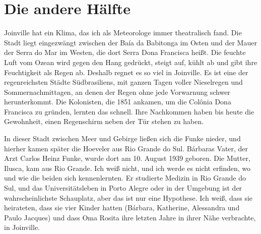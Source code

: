 \documentclass[
  ngerman,
  11pt,
  openany]{book}
\begin{document}
\section{Die andere Hälfte}\label{die-andere-huxe4lfte}

Joinville hat ein Klima, das ich als Meteorologe immer theatralisch
fand. Die Stadt liegt eingezwängt zwischen der Baía da Babitonga im
Osten und der Mauer der Serra do Mar im Westen, die dort Serra Dona
Francisca heißt. Die feuchte Luft vom Ozean wird gegen den Hang
gedrückt, steigt auf, kühlt ab und gibt ihre Feuchtigkeit als Regen ab.
Deshalb regnet es so viel in Joinville. Es ist eine der regenreichsten
Städte Südbrasiliens, mit ganzen Tagen voller Nieselregen und
Sommernachmittagen, an denen der Regen ohne jede Vorwarnung schwer
herunterkommt. Die Kolonisten, die 1851 ankamen, um die Colônia Dona
Francisca zu gründen, lernten das schnell. Ihre Nachkommen haben bis
heute die Gewohnheit, einen Regenschirm neben der Tür stehen zu haben.

In dieser Stadt zwischen Meer und Gebirge ließen sich die Funke nieder,
und hierher kamen später die Hoeveler aus Rio Grande do Sul. Bárbaras
Vater, der Arzt Carlos Heinz Funke, wurde dort am 10. August 1939
geboren. Die Mutter, Ilusca, kam aus Rio Grande. Ich weiß nicht, und ich
werde es nicht erfinden, wo und wie die beiden sich kennenlernten. Er
studierte Medizin in Rio Grande do Sul, und das Universitätsleben in
Porto Alegre oder in der Umgebung ist der wahrscheinlichste Schauplatz,
aber das ist nur eine Hypothese. Ich weiß, dass sie heirateten, dass sie
vier Kinder hatten (Bárbara, Katherine, Alessandra und Paulo Jacques)
und dass Oma Rosita ihre letzten Jahre in ihrer Nähe verbrachte, in
Joinville.
\end{document}
